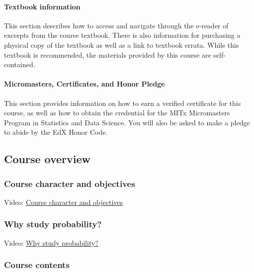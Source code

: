 \documentclass[pdftex, brazil, 12pt, twoside]{article}
\begin{document}
\paragraph{Textbook information}
This section describes how to access and navigate through the e-reader of excerpts
from the course textbook. There is also information for purchasing a physical copy
of the textbook as well as a link to textbook errata. While this textbook is
recommended, the materials provided by this course are self-contained.

\paragraph{Micromasters, Certificates, and Honor Pledge}
This section provides information on how to earn a verified certificate for this
course, as well as how to obtain the credential for the MITx Micromasters Program
in Statistics and Data Science. You will also be asked to make a pledge to abide
by the EdX Honor Code.


\subsection{Course overview}
\label{ovw0-co}

\subsubsection{Course character and objectives}
\label{ovw0-co-objectives}

Video: \href{https://www.youtube.com/watch?v=OM3iEZGC2-k}{Course character and objectives}

\subsubsection{Why study probability?}
\label{ovw0-co-why}

Video: \href{https://www.youtube.com/watch?v=cvVmmboMiyY}{Why study probability?}

\subsubsection{Course contents}
\label{ovw0-co-contents}
\end{document}
